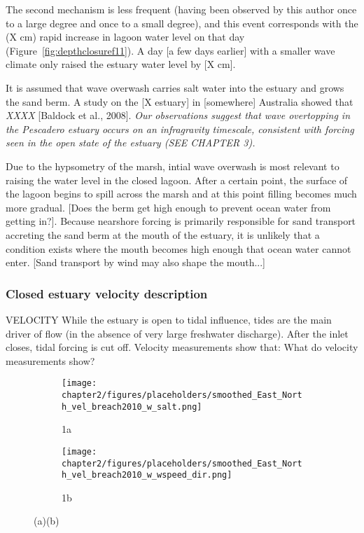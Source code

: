 The second mechanism is less frequent (having been observed by this author once to a large degree and once to a small degree), and this event corresponds with 
the (X cm) rapid increase in lagoon water level on that day (Figure~\ref{fig:depthclosuref11}). A day
[a few days earlier] with a smaller wave climate only raised the estuary
water level by [X cm].

It is assumed that wave overwash carries salt water into the estuary and
grows the sand berm. A study on the [X estuary] in [somewhere] Australia
showed that \emph{XXXX} [Baldock et al., 2008]. \emph{Our observations suggest that wave overtopping in the Pescadero 
estuary occurs on an infragravity timescale, consistent with forcing seen in the open state of the estuary (SEE CHAPTER 3).}

Due to the hypsometry of the marsh, intial wave overwash is most
relevant to raising the water level in the closed lagoon. After a
certain point, the surface of the lagoon begins to spill across the
marsh and at this point filling becomes much more gradual. [Does the
berm get high enough to prevent ocean water from getting in?]. Because
nearshore forcing is primarily responsible for sand transport accreting
the sand berm at the mouth of the estuary, it is unlikely that a
condition exists where the mouth becomes high enough that ocean water
cannot enter. [Sand transport by wind may also shape the mouth...]

\subsubsection{Closed estuary velocity description} \label{cl_vel}
VELOCITY While the estuary is open to tidal influence, tides are the
main driver of flow (in the absence of very large freshwater discharge).
After the inlet closes, tidal forcing is cut off. Velocity measurements
show that: {What do velocity measurements show?}


\begin{figure}[t]
\begin{subfigure}{.5\textwidth}
	\centering
	\texttt{[image: chapter2/figures/placeholders/smoothed\_East\_North\_vel\_breach2010\_w\_salt.png]}
	\caption{1a}
	\label{fig:closed_UVwindsalta}
\end{subfigure}
\begin{subfigure}{.5\textwidth}
	\centering
	\texttt{[image: chapter2/figures/placeholders/smoothed\_East\_North\_vel\_breach2010\_w\_wspeed\_dir.png]}
	\caption{1b}
	\label{fig:closed_UVwindsaltb}
\end{subfigure}
\caption{(a)(b)}
\label{fig:close_UVwindsalt}
\end{figure}

